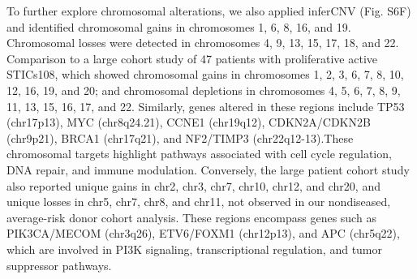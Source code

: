 \begin{refsection}
    To further explore chromosomal alterations, we also applied inferCNV (Fig. S6F) and identified chromosomal gains in chromosomes 1, 6, 8, 16, and 19. Chromosomal losses were detected in chromosomes 4, 9, 13, 15, 17, 18, and 22.  Comparison to a large cohort study of 47 patients with proliferative active STICs108, which showed chromosomal gains in chromosomes 1, 2, 3, 6, 7, 8, 10, 12, 16, 19, and 20; and chromosomal depletions in chromosomes 4, 5, 6, 7, 8, 9, 11, 13, 15, 16, 17, and 22. Similarly, genes altered in these regions include TP53 (chr17p13), MYC (chr8q24.21), CCNE1 (chr19q12), CDKN2A/CDKN2B (chr9p21), BRCA1 (chr17q21), and NF2/TIMP3 (chr22q12-13).These chromosomal targets highlight pathways associated with cell cycle regulation, DNA repair, and immune modulation. Conversely, the large patient cohort study also reported unique gains in chr2, chr3, chr7, chr10, chr12, and chr20, and unique losses in chr5, chr7, chr8, and chr11, not observed in our nondiseased, average-risk donor cohort analysis. These regions encompass genes such as PIK3CA/MECOM (chr3q26), ETV6/FOXM1 (chr12p13), and APC (chr5q22), which are involved in PI3K signaling, transcriptional regulation, and tumor suppressor pathways. 
    
    \printbibliography[heading=subbibliography, title={References}]
\end{refsection}